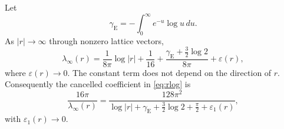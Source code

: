 \begin{proposition}
\label{prop:logsep}
Let
\[
\gamma_{\mathrm{E}}
=-\int_0^\infty e^{-u}\log u\,du.
\]
As \(|r|\to\infty\) through nonzero lattice vectors,
\begin{equation}
\label{eq:lamconst}
\lambda_\infty(r)
=\frac{1}{8\pi}\log|r|
+\frac{1}{16}
+\frac{\gamma_{\mathrm{E}}+\frac32\log 2}{8\pi}
+\varepsilon(r),
\end{equation}
where \(\varepsilon(r)\to 0\).
The constant term does not depend on the direction of \(r\).
Consequently the cancelled coefficient in \eqref{eq:rlog} is
\begin{equation}
\label{eq:cancconst}
\frac{16\pi}{\lambda_\infty(r)}
=\frac{128\pi^2}
{\log|r|+\gamma_{\mathrm{E}}+\frac32\log 2+\frac\pi2+\varepsilon_1(r)},
\end{equation}
with \(\varepsilon_1(r)\to 0\).
\end{proposition}

